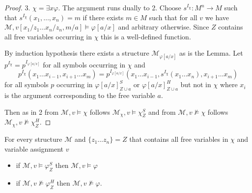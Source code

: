 \documentclass[a4paper,UKenglish,cleveref, autoref, thm-restate]{lipics-v2021}
\begin{document}
\begin{proof}
	3. $\chi = \exists x\varphi$. The argument runs dually to 2. Choose $s^{I_\chi}:M^n\to M$ such that $s^{I_\chi}(x_1,\dots, x_n) = m$ if there exists $m\in M$ such that for all $v$ we have $\mathcal M, v[x_1/z_1\dots x_n/z_n, m/a]\models\varphi[a/x]$ and arbitrary otherwise. Since $Z$ contains all free variables occurring in $\chi$ this is a well-defined function.
	
	By induction hypothesis there exists a structure $\mathcal M_{\varphi[a/x]}$ as is the Lemma. Let $p^{I_\chi} = p^{I_{\varphi[a/x]}}$ for all symbols occurring in $\chi$ and $$p^{I_\chi}(x_1\dots x_{i-1}, x_{i+1}\dots x_m) = p^{I_{\varphi[a/x]}}(x_1\dots x_{i-1}, s^{I_\chi}(x_1\dots x_n), x_{i+1}\dots x_m)$$ for all symbols $p$ occurring in $\varphi[a/x]^S_{Z\cup a}$ or $\varphi[a/x]^H_{Z\cup a}$ but not in $\chi$ where $x_i$ is the argument corresponding to the free variable $a$.
	
	Then as in 2 from $\mathcal M, v\models \chi$ follows $\mathcal M_\chi,v\models\chi^S_Z$ and from $\mathcal M, v\not\models \chi$ follows $\mathcal M_\chi,v\not\models\chi^H_Z$.
\end{proof}

\begin{lemma}\label{ap2}
	For every structure $\mathcal M$ and $\{z_1\dots z_n\} = Z$ that contains all free variables in $\chi$ and variable assignment $v$
	\begin{itemize}
		\item if $\mathcal M, v\models\varphi^S_Z$ then $\mathcal M, v\models \varphi$
		\item if $\mathcal M, v\not\models\varphi^H_Z$ then $\mathcal M, v\not\models\varphi$.
	\end{itemize}
\end{lemma}
\end{document}

